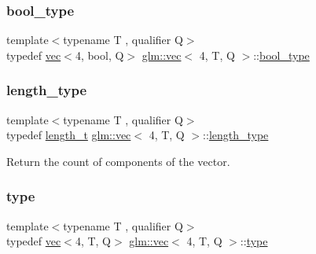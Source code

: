 \subsubsection{\texorpdfstring{bool\+\_\+type}{bool\_type}}
{\footnotesize\ttfamily template$<$typename T , qualifier Q$>$ \\
typedef \hyperlink{structglm_1_1vec}{vec}$<$4, bool, Q$>$ \hyperlink{structglm_1_1vec}{glm\+::vec}$<$ 4, T, Q $>$\+::\hyperlink{structglm_1_1vec_3_014_00_01_t_00_01_q_01_4_a175b3fdeb819aab912118ac1605b675b}{bool\+\_\+type}}

\mbox{\label{structglm_1_1vec_3_014_00_01_t_00_01_q_01_4_af1c8f56963141951f4a4724b47e072d9}} 
\subsubsection{\texorpdfstring{length\+\_\+type}{length\_type}}
{\footnotesize\ttfamily template$<$typename T , qualifier Q$>$ \\
typedef \hyperlink{namespaceglm_a090a0de2260835bee80e71a702492ed9}{length\+\_\+t} \hyperlink{structglm_1_1vec}{glm\+::vec}$<$ 4, T, Q $>$\+::\hyperlink{structglm_1_1vec_3_014_00_01_t_00_01_q_01_4_af1c8f56963141951f4a4724b47e072d9}{length\+\_\+type}}



Return the count of components of the vector. 

\mbox{\label{structglm_1_1vec_3_014_00_01_t_00_01_q_01_4_ab2b893dfe27b0d0f154d66315f35de47}} 
\subsubsection{\texorpdfstring{type}{type}}
{\footnotesize\ttfamily template$<$typename T , qualifier Q$>$ \\
typedef \hyperlink{structglm_1_1vec}{vec}$<$4, T, Q$>$ \hyperlink{structglm_1_1vec}{glm\+::vec}$<$ 4, T, Q $>$\+::\hyperlink{structglm_1_1vec_3_014_00_01_t_00_01_q_01_4_ab2b893dfe27b0d0f154d66315f35de47}{type}}

